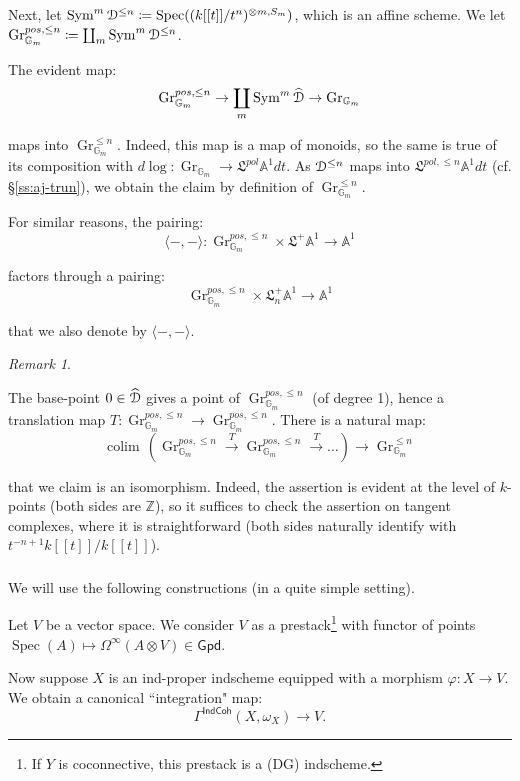 \documentclass[reqno,11pt]{amsart}
\numberwithin{equation}{subsection}
\theoremstyle{remark}
\newtheorem{rem}[thm]{Remark}
\newcommand{\xar}[1]{\xrightarrow{#1}}
\newcommand{\bA}{{\mathbb A}}
\newcommand{\bG}{{\mathbb G}}
\newcommand{\bZ}{{\mathbb Z}}
\newcommand{\sD}{{\EuScript D}}
\newcommand{\fL}{{\mathfrak L}}
\newcommand{\on}{\operatorname}
\newcommand{\Spec}{\on{Spec}}
\newcommand{\vph}{\varphi}
\newcommand{\Gr}{\on{Gr}}
\newcommand{\Sym}{\on{Sym}}
\newcommand{\colim}{\on{colim}}
\newcommand{\Gpd}{\mathsf{Gpd}}
\newcommand{\IndCoh}{\mathsf{IndCoh}}
\newcommand{\pair}[2]{\langle #1,#2 \rangle}
\begin{document}
Next, let $\Sym^m \sD^{\leq n} \coloneqq
\Spec((k[[t]]/t^n)^{\otimes m,S_m})$, which is an
affine scheme. We let $\Gr_{\bG_m}^{pos,\leq n}\coloneqq 
\coprod_m \Sym^m \sD^{\leq n}$.

The evident map:
%
\[
\Gr_{\bG_m}^{pos,\leq n} \to \coprod_m \Sym^m \widehat{\sD} \to \Gr_{\bG_m}
\]

\noindent maps into $\Gr_{\bG_m}^{\leq n}$. Indeed,
this map is a map of monoids, so the same is
true of its composition with $d\log:\Gr_{\bG_m} \to 
\fL^{pol} \bA^1 dt$. As $\sD^{\leq n}$ maps into
$\fL^{pol,\leq n} \bA^1 dt$ (cf. \S \ref{ss:aj-trun}),
we obtain the claim by definition of $\Gr_{\bG_m}^{\leq n}$.


For similar reasons, the pairing:
%
\[
\pair{-}{-}:
\Gr_{\bG_m}^{pos,\leq n} \times \fL^+ \bA^1 \to \bA^1
\]

\noindent factors through a pairing:
%
\[
\Gr_{\bG_m}^{pos,\leq n} \times \fL_n^+ \bA^1 \to \bA^1 
\]

\noindent that we also denote by $\pair{-}{-}$.

\begin{rem}\label{r:gr-n-pos-gp-cpl}

The base-point $0 \in \widehat{\sD}$ gives a point of 
$\Gr_{\bG_m}^{pos,\leq n}$ (of degree 1), hence 
a translation map $T:\Gr_{\bG_m}^{pos,\leq n} \to \Gr_{\bG_m}^{pos,\leq n}$.
There is a natural map:
%
\[
\colim \, (\Gr_{\bG_m}^{pos,\leq n} \xar{T} \Gr_{\bG_m}^{pos,\leq n} \xar{T} \ldots)
\to \Gr_{\bG_m}^{\leq n}
\]

\noindent that we claim is an isomorphism. 
Indeed, the assertion is evident at the level of $k$-points (both sides 
are $\bZ$), so it suffices to check the assertion on tangent complexes,
where it is straightforward (both sides naturally identify with 
$t^{-n+1}k[[t]]/k[[t]]$). 

\end{rem}


\subsubsection{}\label{ss:pairing-map}

We will use the following constructions (in a quite simple setting).

Let $V$ be a vector space. We consider $V$ as a prestack\footnote{If $Y$ is
coconnective, this prestack is a (DG) indscheme.}
with functor of points $\Spec(A) \mapsto \Omega^{\infty}(A\otimes V) \in \Gpd$.

Now suppose $X$ is an ind-proper indscheme equipped with a morphism
$\vph:X \to V$. We obtain a canonical ``integration" map:
%
\begin{equation}\label{eq:integration}
\Gamma^{\IndCoh}(X,\omega_X) \to V.
\end{equation}
\end{document}
